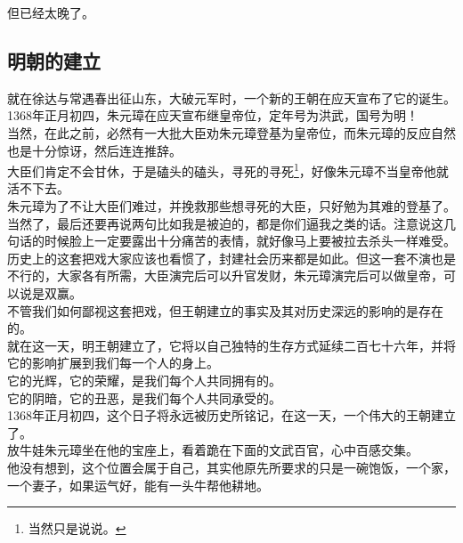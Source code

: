 \begin{multicols}{\theparacolNo}
但已经太晚了。\\

\subsection{明朝的建立}
就在徐达与常遇春出征山东，大破元军时，一个新的王朝在应天宣布了它的诞生。\\

1368年正月初四，朱元璋在应天宣布继皇帝位，定年号为洪武，国号为明！\\

当然，在此之前，必然有一大批大臣劝朱元璋登基为皇帝位，而朱元璋的反应自然也是十分惊讶，然后连连推辞。\\

大臣们肯定不会甘休，于是磕头的磕头，寻死的寻死\footnote{当然只是说说。}，好像朱元璋不当皇帝他就活不下去。\\

朱元璋为了不让大臣们难过，并挽救那些想寻死的大臣，只好勉为其难的登基了。\\

当然了，最后还要再说两句比如我是被迫的，都是你们逼我之类的话。注意说这几句话的时候脸上一定要露出十分痛苦的表情，就好像马上要被拉去杀头一样难受。\\

历史上的这套把戏大家应该也看惯了，封建社会历来都是如此。但这一套不演也是不行的，大家各有所需，大臣演完后可以升官发财，朱元璋演完后可以做皇帝，可以说是双赢。\\

不管我们如何鄙视这套把戏，但王朝建立的事实及其对历史深远的影响的是存在的。\\

就在这一天，明王朝建立了，它将以自己独特的生存方式延续二百七十六年，并将它的影响扩展到我们每一个人的身上。\\

它的光辉，它的荣耀，是我们每个人共同拥有的。\\

它的阴暗，它的丑恶，是我们每个人共同承受的。\\

1368年正月初四，这个日子将永远被历史所铭记，在这一天，一个伟大的王朝建立了。\\

放牛娃朱元璋坐在他的宝座上，看着跪在下面的文武百官，心中百感交集。\\

他没有想到，这个位置会属于自己，其实他原先所要求的只是一碗饱饭，一个家，一个妻子，如果运气好，能有一头牛帮他耕地。\\


\end{multicols}
